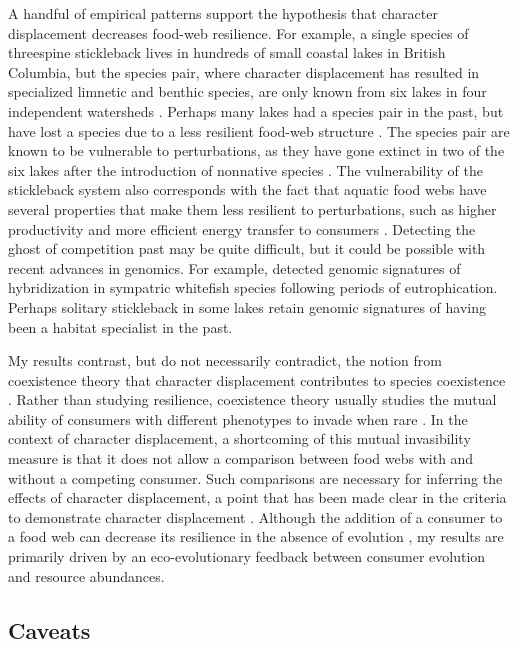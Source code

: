 \documentclass[11pt,]{article}
\begin{document}
A handful of empirical patterns support the hypothesis that character
displacement decreases food-web resilience. For example, a single
species of threespine stickleback lives in hundreds of small coastal
lakes in British Columbia, but the species pair, where character
displacement has resulted in specialized limnetic and benthic species,
are only known from six lakes in four independent watersheds
\citep{Schluter1992, Schluter2000}. Perhaps many lakes had a species
pair in the past, but have lost a species due to a less resilient
food-web structure \citep{Borrelli2015a, Borrelli2015b}. The species
pair are known to be vulnerable to perturbations, as they have gone
extinct in two of the six lakes after the introduction of nonnative
species \citep{Hatfield2001, Taylor2006, Rudman2016}. The vulnerability
of the stickleback system also corresponds with the fact that aquatic
food webs have several properties that make them less resilient to
perturbations, such as higher productivity and more efficient energy
transfer to consumers \citep{Rip2011}. Detecting the ghost of
competition past \citep{Connell1980} may be quite difficult, but it
could be possible with recent advances in genomics. For example,
\citet{Feulner2018} detected genomic signatures of hybridization in
sympatric whitefish species following periods of eutrophication. Perhaps
solitary stickleback in some lakes retain genomic signatures of having
been a habitat specialist in the past.

My results contrast, but do not necessarily contradict, the notion from
coexistence theory that character displacement contributes to species
coexistence \citep{Lawlor1976}. Rather than studying resilience,
coexistence theory usually studies the mutual ability of consumers with
different phenotypes to invade when rare \citep[i.e., mutual
invasibility;][]{Chesson2000}. In the context of character displacement,
a shortcoming of this mutual invasibility measure is that it does not
allow a comparison between food webs with and without a competing
consumer. Such comparisons are necessary for inferring the effects of
character displacement, a point that has been made clear in the criteria
to demonstrate character displacement
\citep{Schluter1992, Schluter2000}. Although the addition of a consumer
to a food web can decrease its resilience in the absence of evolution
\citep{May1973}, my results are primarily driven by an eco-evolutionary
feedback between consumer evolution and resource abundances.

\subsection{Caveats}\label{caveats}
\end{document}
